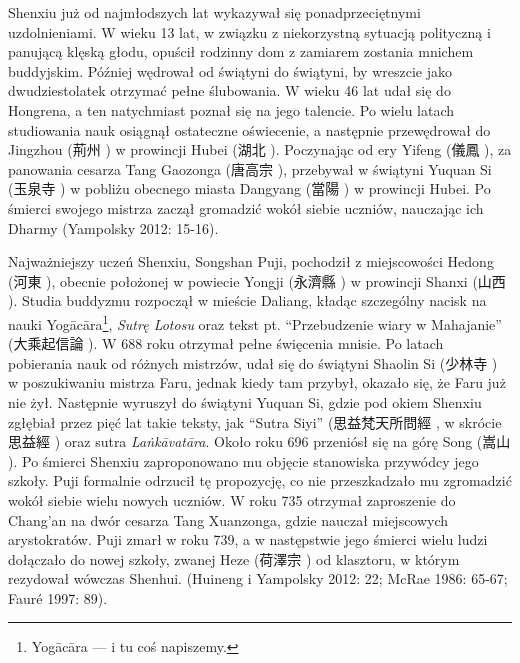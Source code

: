 Shenxiu już od najmłodszych lat wykazywał się ponadprzeciętnymi uzdolnieniami.
W wieku 13 lat, w związku z niekorzystną sytuacją polityczną i panującą klęską głodu, opuścił rodzinny dom z zamiarem zostania mnichem buddyjskim.
Później wędrował od świątyni do świątyni, by wreszcie jako dwudziestolatek otrzymać pełne ślubowania.
W wieku 46 lat udał się do Hongrena, a ten natychmiast poznał się na jego talencie.
Po wielu latach studiowania nauk osiągnął ostateczne oświecenie, a następnie przewędrował do Jingzhou (荊州 ) w prowincji Hubei (湖北 ).
Poczynając od ery Yifeng (儀鳳 ), za panowania cesarza Tang Gaozonga (唐高宗 ), przebywał w świątyni Yuquan Si (玉泉寺 ) w pobliżu obecnego miasta Dangyang (當陽 ) w prowincji Hubei.
Po śmierci swojego mistrza zaczął gromadzić wokół siebie uczniów, nauczając ich Dharmy
(Yampolsky 2012: 15-16).

Najważniejszy uczeń Shenxiu, Songshan Puji, pochodził z miejscowości Hedong (河東 ), obecnie położonej w powiecie Yongji (永濟縣 ) w prowincji Shanxi (山西 ).
Studia buddyzmu rozpoczął w mieście Daliang, kładąc szczególny nacisk na nauki Yogācāra\footnote{Yogācāra --- i tu coś napiszemy.}, \textit{Sutrę Lotosu} oraz tekst pt. ``Przebudzenie wiary w Mahajanie'' (大乘起信論 ).
W 688 roku otrzymał pełne święcenia mnisie.
Po latach pobierania nauk od różnych mistrzów, udał się do świątyni Shaolin Si (少林寺 ) w poszukiwaniu mistrza Faru, jednak kiedy tam przybył, okazało się, że Faru już nie żył.
Następnie wyruszył do świątyni Yuquan Si, gdzie pod okiem Shenxiu zgłębiał przez pięć lat takie teksty, jak ``Sutra Siyi'' (思益梵天所問經 , w skrócie 思益經 ) oraz sutra \textit{La\.nkā\-vatāra}.
Około roku 696 przeniósł się na górę Song (嵩山 ).
Po śmierci Shenxiu zaproponowano mu objęcie stanowiska przywódcy jego szkoły.
Puji formalnie odrzucił tę propozycję, co nie przeszkadzało mu zgromadzić wokół siebie wielu nowych uczniów.
W roku 735 otrzymał zaproszenie do Chang'an na dwór cesarza Tang Xuanzonga, gdzie nauczał miejscowych arystokratów.
Puji zmarł w roku 739, a w następstwie jego śmierci wielu ludzi dołączało do nowej szkoły, zwanej Heze (荷澤宗 ) od klasztoru, w którym rezydował wówczas Shenhui. %
(Huineng i Yampolsky 2012: 22; McRae 1986: 65-67; Fauré 1997: 89).

